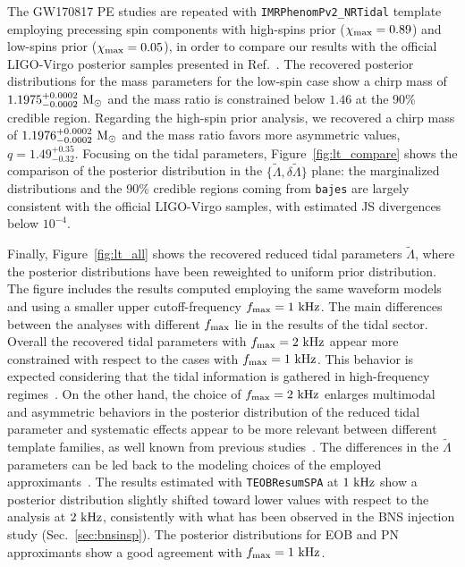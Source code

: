 \documentclass[prd,aps,twocolumn,a4paper,showkeys,nofootinbib,floatfix]{revtex4-1}
\def\Mo{{\rm M_{\odot}}}
\def\tLam{{\tilde\Lambda}}
\def\dLam{{\delta\tilde\Lambda}}
\newcommand{\bajes}{{\tt bajes}}
\begin{document}
The GW170817 PE studies are repeated with 
{\tt IMRPhenomPv2\_NRTidal} template employing precessing spin components with high-spins prior ($\chi_{\rm max}=0.89$) and low-spins prior ($\chi_{\rm max}=0.05$),
in order to compare our results with the official LIGO-Virgo posterior
samples presented in Ref.~\cite{Abbott:2018wiz}.
The recovered posterior distributions for the mass parameters
for the low-spin case show a chirp mass of 
$1.1975^{+0.0002}_{-0.0002}~\Mo$ and the mass ratio is constrained 
below $1.46$ at the 90\% credible region.
Regarding the high-spin prior analysis, 
we recovered a chirp mass of 
$1.1976^{+0.0002}_{-0.0002}~\Mo$ 
and the mass ratio favors more asymmetric values, $q=1.49^{+0.35}_{-0.32}$.
Focusing on the tidal parameters,
Figure~\ref{fig:lt_compare} shows the comparison of the 
posterior distribution in the $\{\tLam,\dLam\}$ plane:
the marginalized distributions and the 90\% credible regions
coming from {\bajes} are largely
consistent with the official LIGO-Virgo samples,
with estimated JS divergences below $10^{-4}$.

Finally, Figure~\ref{fig:lt_all} shows the recovered 
reduced tidal parameters $\tLam$, where the posterior
distributions have been reweighted to uniform prior distribution.
The figure includes the results computed 
employing the same waveform models and using a smaller upper cutoff-frequency $f_{\rm max}=1~{\rm kHz}$.
The main differences between the analyses with different $f_{\rm max}$ 
lie in the results of the tidal sector.
Overall the recovered tidal parameters with $f_{\rm max}=2~{\rm kHz}$
appear more constrained with respect to the cases with $f_{\rm max}=1~{\rm kHz}$.
This behavior is expected considering that the tidal information
is gathered in high-frequency regimes~\cite{Damour:2012yf,Gamba:2020wgg}.
On the other hand,
the choice of $f_{\rm max}=2~{\rm kHz}$ enlarges 
multimodal and asymmetric behaviors in the posterior distribution of the 
reduced tidal parameter and systematic effects appear to be more relevant
between different template families,
as well known from previous studies~\cite{Dai:2018dca,Narikawa:2018yzt,Gamba:2020wgg}. 
The differences in the $\tLam$
parameters can be led back to the modeling choices
of the employed approximants~\citep[see][]{Abbott:2018wiz,Messina:2019uby,LIGOScientific:2018mvr}.
The results estimated with {\tt TEOBResumSPA} at $1~{\rm kHz}$
show a posterior distribution slightly shifted toward lower values with respect to 
the analysis at $2~{\rm kHz}$,
consistently with what has been observed in the BNS injection study (Sec.~\ref{sec:bnsinsp}).
The posterior distributions for EOB and PN approximants show a 
good agreement with $f_{\rm max}=1~{\rm kHz}$.
\end{document}
